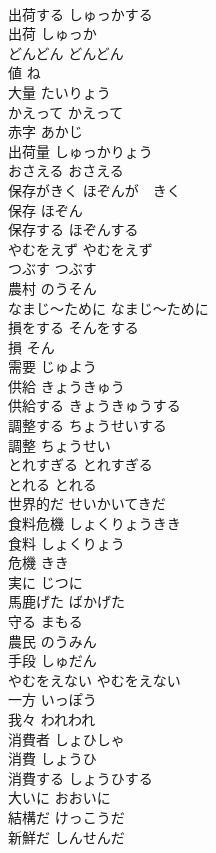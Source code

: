 \documentclass[8pt]{extreport}
\begin{document}
\begin{CJK}{UTF8}{min}
\\	出荷する	しゅっかする	
\\	出荷	しゅっか	
\\	どんどん	どんどん	
\\	値	ね	
\\	大量	たいりょう	
\\	かえって	かえって	
\\	赤字	あかじ	
\\	出荷量	しゅっかりょう	
\\	おさえる	おさえる	
\\	保存がきく	ほぞんが　きく	
\\	保存	ほぞん	
\\	保存する	ほぞんする	
\\	やむをえず	やむをえず	
\\	つぶす	つぶす	
\\	農村	のうそん	
\\	なまじ〜ために	なまじ〜ために	
\\	損をする	そんをする	
\\	損	そん	
\\	需要	じゅよう	
\\	供給	きょうきゅう	
\\	供給する	きょうきゅうする	
\\	調整する	ちょうせいする	
\\	調整	ちょうせい	
\\	とれすぎる	とれすぎる	
\\	とれる	とれる	
\\	世界的だ	せいかいてきだ	
\\	食料危機	しょくりょうきき	
\\	食料	しょくりょう	
\\	危機	きき	
\\	実に	じつに	
\\	馬鹿げた	ばかげた	
\\	守る	まもる	
\\	農民	のうみん	
\\	手段	しゅだん	
\\	やむをえない	やむをえない	
\\	一方	いっぽう	
\\	我々	われわれ	
\\	消費者	しょひしゃ	
\\	消費	しょうひ	
\\	消費する	しょうひする	
\\	大いに	おおいに	
\\	結構だ	けっこうだ	
\\	新鮮だ	しんせんだ	

\end{CJK}
\end{document}
